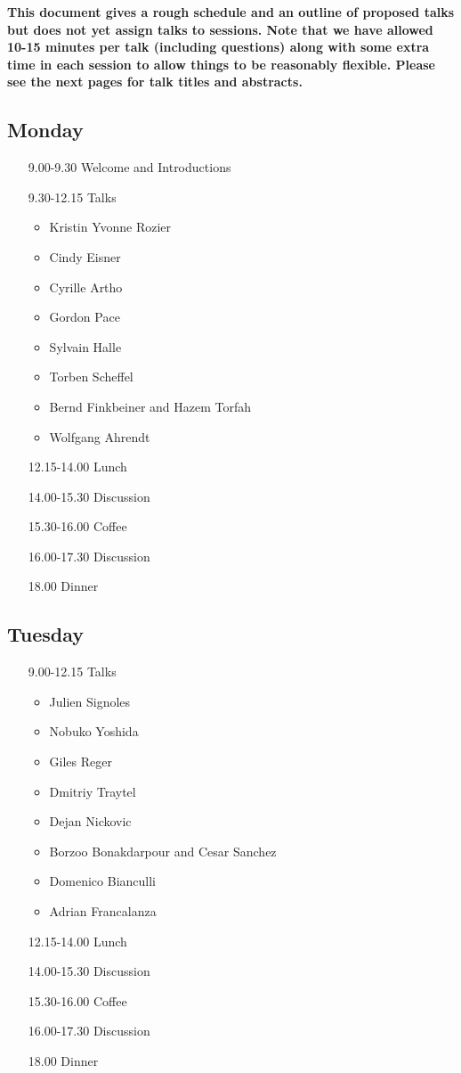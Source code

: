 \documentclass{article}
\begin{document}
\noindent
\textbf{\color{red}This document gives a rough schedule and an outline of proposed talks but does not yet assign talks to sessions. Note that we have allowed 10-15 minutes per talk (including questions) along with some extra time in each session to allow things to be reasonably flexible. Please see the next pages for talk titles and abstracts.}

\subsection*{Monday}

\begin{itemize}
	\item[9.00-9.30] Welcome and Introductions
	\item[9.30-12.15] Talks
	\begin{itemize}
		\item Kristin Yvonne Rozier
		\item Cindy Eisner
		\item Cyrille Artho
		\item Gordon Pace
		\item Sylvain Halle
		\item Torben Scheffel
		\item Bernd Finkbeiner and Hazem Torfah
		\item Wolfgang Ahrendt
	\end{itemize}	
	\item[12.15-14.00] Lunch 
	\item[14.00-15.30] Discussion
	\item[15.30-16.00] Coffee
	\item[16.00-17.30] Discussion
	\item[18.00] Dinner
\end{itemize}

\subsection*{Tuesday}

\begin{itemize}
	\item[9.00-12.15] Talks
	\begin{itemize}
		\item Julien Signoles
\item Nobuko Yoshida
\item Giles Reger
\item Dmitriy Traytel
\item Dejan Nickovic
\item Borzoo Bonakdarpour and Cesar Sanchez
\item Domenico Bianculli
\item Adrian Francalanza
	\end{itemize}
	\item[12.15-14.00] Lunch 
	\item[14.00-15.30] Discussion
	\item[15.30-16.00] Coffee
	\item[16.00-17.30] Discussion
	\item[18.00] Dinner
\end{itemize}
\end{document}
